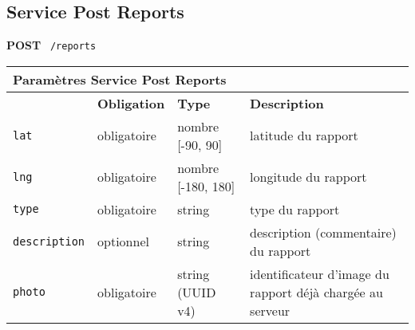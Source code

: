 \subsection{Service Post Reports}
\label{appendix:sprint1-reports-post-doc}

\textbf{POST} \ \texttt{/reports}

\begin{table}[H]
    \centering
    \begin{tabularx}{\textwidth}{@{}p{2.5cm} p{2cm} p{3.5cm} p{5.5cm}@{}}
        \multicolumn{4}{X}{\textbf{Paramètres Service Post Reports}} \\
        \toprule
        \rowcolor{gray!20}
        \multicolumn{1}{l}{\textbf{Élément}} &
        \multicolumn{1}{l}{\textbf{Obligation}} &
        \multicolumn{1}{l}{\textbf{Type}} &
        \multicolumn{1}{l}{\textbf{Description}} \\
        \midrule
        \verb|lat| & obligatoire & nombre [-90, 90] & latitude du rapport \\
        \verb|lng| & obligatoire & nombre [-180, 180] & longitude du rapport \\
        \verb|type| & obligatoire & string & type du rapport \\
        \verb|description| & optionnel & string & description (commentaire) du rapport \\
        \verb|photo| & obligatoire & string (UUID v4) & identificateur d'image du rapport déjà chargée au serveur \\
        \bottomrule
    \end{tabularx}
\end{table}
